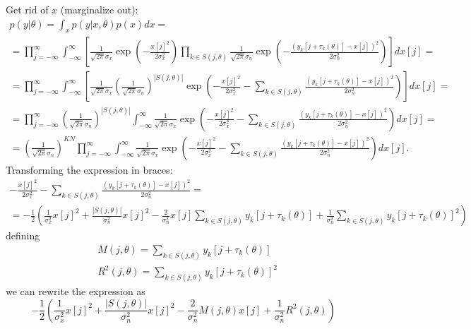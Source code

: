\documentclass[a4paper]{article}
\begin{document}
Get rid of $x$ (marginalize out):
\begin{multline}
p(y|\theta) = \int_x p(y | x, \theta) p(x) dx = \\
= \prod_{j=-\infty}^\infty \int_{-\infty}^\infty \left[ \frac{1}{\sqrt{2\pi}\sigma_x} \exp\left(-\frac{x[j]^2}{2\sigma_x^2}\right) \prod_{k \in S(j,\theta)} \frac{1}{\sqrt{2\pi} \sigma_n} \exp\left(-\frac{(y_k[j+\tau_k(\theta)] - x[j])^2}{2\sigma_n^2}\right) \right] dx[j] = \\
= \prod_{j=-\infty}^\infty \int_{-\infty}^\infty \left[ \frac{1}{\sqrt{2\pi}\sigma_x} \left(\frac{1}{\sqrt{2\pi} \sigma_n}\right)^{|S(j,\theta)|} \exp\left(-\frac{x[j]^2}{2\sigma_x^2} - \sum_{k \in S(j,\theta)} \frac{(y_k[j+\tau_k(\theta)] - x[j])^2}{2\sigma_n^2}\right) \right] dx[j] = \\
= \prod_{j=-\infty}^\infty  \left(\frac{1}{\sqrt{2\pi} \sigma_n}\right)^{|S(j,\theta)|} \int_{-\infty}^\infty \frac{1}{\sqrt{2\pi}\sigma_x}\exp\left(-\frac{x[j]^2}{2\sigma_x^2} - \sum_{k \in S(j,\theta)} \frac{(y_k[j+\tau_k(\theta)] - x[j])^2}{2\sigma_n^2}\right) dx[j] = \\
= \left(\frac{1}{\sqrt{2\pi} \sigma_n}\right)^{KN} \prod_{j=-\infty}^\infty  \int_{-\infty}^\infty\frac{1}{\sqrt{2\pi}\sigma_x} \exp\left(-\frac{x[j]^2}{2\sigma_x^2} - \sum_{k \in S(j,\theta)} \frac{(y_k[j+\tau_k(\theta)] - x[j])^2}{2\sigma_n^2}\right) dx[j].
\label{eq:likelihood y|theta}
\end{multline}
Transforming the expression in braces:
\begin{multline}
-\frac{x[j]^2}{2\sigma_x^2} - \sum_{k \in S(j,\theta)} \frac{(y_k[j+\tau_k(\theta)] - x[j])^2}{2\sigma_n^2} =  \\
= -\frac{1}{2} \left( \frac{1}{\sigma_x^2}x[j]^2  + \frac{|S(j,\theta)|}{\sigma_n^2} x[j]^2 - \frac{2}{\sigma_n^2} x[j] \sum_{k \in S(j,\theta)} y_k[j+\tau_k(\theta)] + \frac{1}{\sigma_n^2}\sum_{k \in S(j,\theta)} y_k[j+\tau_k(\theta)]^2 \right)
\end{multline}
defining
\begin{align*}
&M(j,\theta) = \sum_{k \in S(j,\theta)} y_k[j+\tau_k(\theta)] \\
&R^2(j,\theta) = \sum_{k \in S(j,\theta)} y_k[j+\tau_k(\theta)]^2
\end{align*}
we can rewrite the expression as
\begin{equation}
-\frac{1}{2} \left( \frac{1}{\sigma_x^2}x[j]^2  + \frac{|S(j,\theta)|}{\sigma_n^2} x[j]^2 - \frac{2}{\sigma_n^2} M(j,\theta) x[j] + \frac{1}{\sigma_n^2}R^2(j,\theta) \right)
\end{equation}
\end{document}
